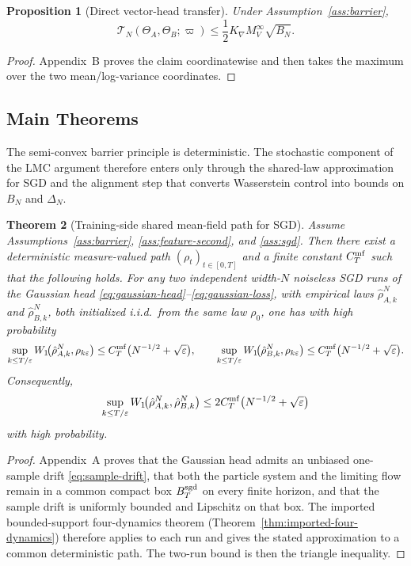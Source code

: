 \documentclass[11pt]{article}
\newtheorem{theorem}{Theorem}[section]
\newtheorem{proposition}[theorem]{Proposition}
\theoremstyle{definition}
\newcommand{\cT}{\mathcal{T}}
\begin{document}
\begin{proposition}[Direct vector-head transfer]
\label{prop:transfer}
Under Assumption~\ref{ass:barrier},
\begin{equation}
  \cT_N(\Theta_A,\Theta_B;\varpi)
  \le
  \frac12 K_{\nabla}M_V^\infty \sqrt{B_N}.
  \label{eq:transfer}
\end{equation}
\end{proposition}

\begin{proof}
Appendix~B proves the claim coordinatewise and then takes the maximum over the
two mean/log-variance coordinates.
\end{proof}

\subsection{Main Theorems}

The semi-convex barrier principle is deterministic. The stochastic component
of the LMC argument therefore enters only through the shared-law approximation
for SGD and the alignment step that converts Wasserstein control into bounds on
$B_N$ and $\Delta_N$.

\begin{theorem}[Training-side shared mean-field path for SGD]
\label{thm:shared-path}
Assume Assumptions~\ref{ass:barrier}, \ref{ass:feature-second}, and
\ref{ass:sgd}. Then there exist a deterministic measure-valued path
$(\rho_t)_{t\in[0,T]}$ and a finite constant $C_T^{\rm mf}$ such that the
following holds. For any two independent width-$N$ noiseless SGD runs of the
Gaussian head \eqref{eq:gaussian-head}--\eqref{eq:gaussian-loss}, with empirical laws
$\hat\rho_{A,k}^N$ and $\hat\rho_{B,k}^N$, both initialized i.i.d.\ from the
same law $\rho_0$, one has with high probability
\[
  \sup_{k\le T/\varepsilon}
  W_1\!\bigl(\hat\rho_{A,k}^N,\rho_{k\varepsilon}\bigr)
  \le
  C_T^{\rm mf}\bigl(N^{-1/2}+\sqrt{\varepsilon}\bigr),
  \qquad
  \sup_{k\le T/\varepsilon}
  W_1\!\bigl(\hat\rho_{B,k}^N,\rho_{k\varepsilon}\bigr)
  \le
  C_T^{\rm mf}\bigl(N^{-1/2}+\sqrt{\varepsilon}\bigr).
\]
Consequently,
\[
  \sup_{k\le T/\varepsilon}
  W_1\!\bigl(\hat\rho_{A,k}^N,\hat\rho_{B,k}^N\bigr)
  \le
  2C_T^{\rm mf}\bigl(N^{-1/2}+\sqrt{\varepsilon}\bigr)
\]
with high probability.
\end{theorem}

\begin{proof}
Appendix~A proves that the Gaussian head admits an unbiased one-sample drift
\eqref{eq:sample-drift}, that both the particle system and the limiting flow
remain in a common compact box $B_T^{\rm sgd}$ on every finite horizon, and
that the sample drift is uniformly bounded and Lipschitz on that box. The
imported bounded-support four-dynamics theorem
(Theorem~\ref{thm:imported-four-dynamics}) therefore applies to each run and
gives the stated approximation to a common deterministic path. The two-run
bound is then the triangle inequality.
\end{proof}
\end{document}

